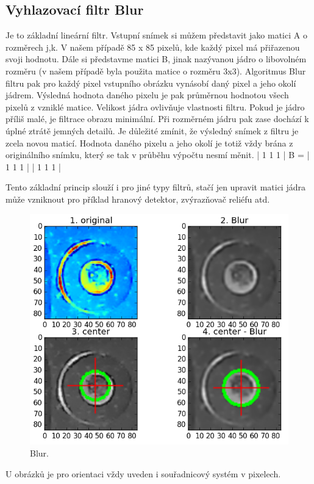 \subsection{Vyhlazovací filtr Blur}

Je to základní lineární filtr. Vstupní snímek si můžem představit jako matici A o rozměrech j,k. V našem případě 85 x 85 pixelů, kde každý pixel má přiřazenou svoji hodnotu. Dále si představme matici B, jinak nazývanou jádro o libovolném rozměru (v našem případě byla použita matice o rozměru 3x3). Algoritmus Blur filtru pak pro každý pixel vstupního obrázku vynásobí daný pixel a jeho okolí jádrem. Výsledná hodnota daného pixelu je pak průměrnou hodnotou všech pixelů z vzniklé matice. Velikost jádra ovlivňuje vlastnosti filtru. Pokud je jádro příliš malé, je filtrace obrazu minimální. Při rozměrném jádru pak zase dochází k úplné ztrátě jemných detailů.
Je důležité zmínit, že výsledný snímek z filtru je zcela novou maticí. Hodnota daného pixelu a jeho okolí je totiž vždy brána z originálního snímku, který se tak v průběhu výpočtu nesmí měnit.
       | 1 1 1 |
B = | 1 1 1 |
       | 1 1 1 |

Tento základní princip slouží i pro jiné typy filtrů, stačí jen upravit matici jádra může vzniknout pro příklad hranový detektor, zvýrazňovač reliéfu atd.

\begin{figure}[h!]
  \centering
    \includegraphics[width=0.8\linewidth]{obrazky/blur.png}%
    \caption{Blur.}
    \label{fig:blur}
\end{figure}

U obrázků je pro orientaci vždy uveden i souřadnicový systém v pixelech.



